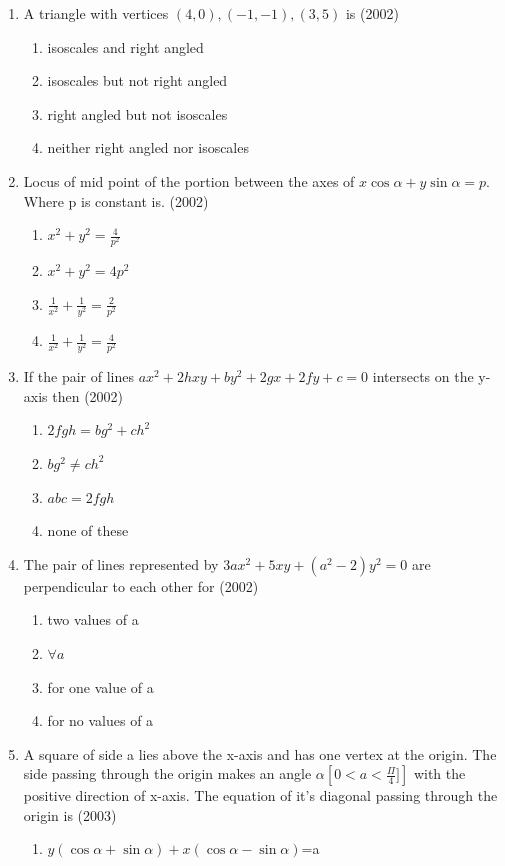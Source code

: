 \documentclass[12pt]{article}
\providecommand{\brak}[1]{\ensuremath{\left(#1\right)}}
\begin{document}
\begin{enumerate}
\item A triangle with vertices $(4,0),(-1,-1 ),(3,5)$ is (2002)
\begin{enumerate}
\item isoscales and right angled
\item isoscales  but not right angled
\item right angled but not isoscales 
\item neither right angled nor isoscales 
\end{enumerate}
\item Locus of mid point of the portion between the axes of $x\cos\alpha+y\sin\alpha=p$. Where p is constant is. (2002)
\begin{enumerate}
\item $x^2+y^2=\frac{4}{p^2}$ 
\item $x^2+y^2=4p^2$
\item$\frac{1}{x^2}+\frac{1}{y^2}=\frac{2}{p^2}$ 
\item $\frac{1}{x^2}+\frac{1}{y^2}=\frac{4}{p^2}$ 
\end{enumerate}
\item If the pair of lines $ax^2+2hxy+by^2+2gx+2fy+c=0$ intersects on the y-axis then (2002)
\begin{enumerate}
\item $2fgh=bg^2+ch^2$ 
\item $bg^2\neq ch^2$
\item $abc=2fgh$
\item none of these
\end{enumerate}
\item The pair of lines represented by $3ax^2+5xy+(a^2-2)y^2=0$ are perpendicular to each other for (2002)
\begin{enumerate}
\item two values of a 
\item $\forall a$
\item for one value of a 
\item for no values of a
\end{enumerate}
\item A square of side a lies above the x-axis and has one vertex at the origin. The side passing through the origin makes an angle $\alpha \left[ 0<a<\frac{\Pi}{4}]\right]$ with the positive direction of x-axis. The equation of it's diagonal passing through the origin is (2003)
\begin{enumerate}
\item $y\brak{\cos\alpha+\sin\alpha}+x\brak{\cos\alpha-\sin\alpha}$=a

\end{enumerate}
\end{enumerate}
\end{document}
